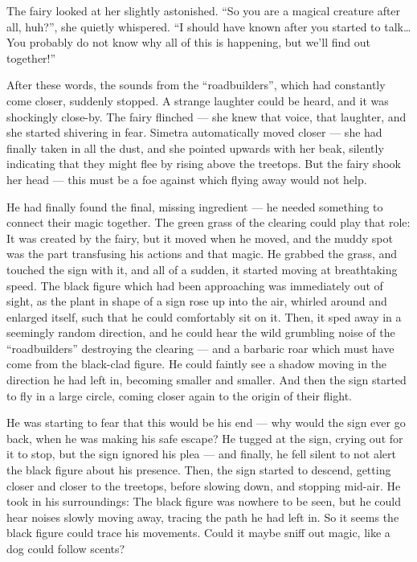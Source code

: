 The fairy looked at her slightly astonished. \enquote{So you are a magical creature after all, huh?}, she quietly whispered. \enquote{I should have known after you started to talk\dots You probably do not know why all of this is happening, but we'll find out together!}

After these words, the sounds from the \enquote{roadbuilders}, which had constantly come closer, suddenly stopped. A strange laughter could be heard, and it was shockingly close-by. The fairy flinched --- she knew that voice, that laughter, and she started shivering in fear. Simetra automatically moved closer --- she had finally taken in all the dust, and she pointed upwards with her beak, silently indicating that they might flee by rising above the treetops. But the fairy shook her head --- this must be a foe against which flying away would not help.

\froufrou{}

He had finally found the final, missing ingredient --- he needed something to connect their magic together. The green grass of the clearing could play that role: It was created by the fairy, but it moved when he moved, and the muddy spot was the part transfusing his actions and that magic. He grabbed the grass, and touched the sign with it, and all of a sudden, it started moving at breathtaking speed. The black figure which had been approaching was immediately out of sight, as the plant in shape of a sign rose up into the air, whirled around and enlarged itself, such that he could comfortably sit on it. Then, it sped away in a seemingly random direction, and he could hear the wild grumbling noise of the \enquote{roadbuilders} destroying the clearing --- and a barbaric roar which must have come from the black-clad figure. He could faintly see a shadow moving in the direction he had left in, becoming smaller and smaller. And then the sign started to fly in a large circle, coming closer again to the origin of their flight.

He was starting to fear that this would be his end --- why would the sign ever go back, when he was making his safe escape? He tugged at the sign, crying out for it to stop, but the sign ignored his plea --- and finally, he fell silent to not alert the black figure about his presence. Then, the sign started to descend, getting closer and closer to the treetops, before slowing down, and stopping mid-air. He took in his surroundings: The black figure was nowhere to be seen, but he could hear noises slowly moving away, tracing the path he had left in. So it seems the black figure could trace his movements. Could it maybe sniff out magic, like a dog could follow scents?

